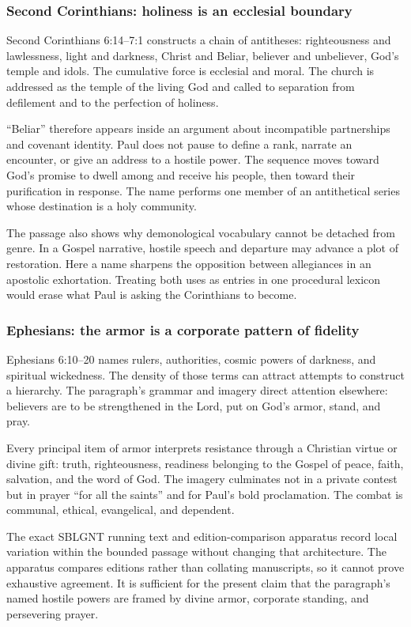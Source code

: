 \subsubsection{Second Corinthians: holiness is an ecclesial boundary}

Second Corinthians 6:14--7:1 constructs a chain of antitheses:
righteousness and lawlessness, light and darkness, Christ and Beliar, believer
and unbeliever, God's temple and idols. The cumulative force is ecclesial and
moral. The church is addressed as the temple of the living God and called to
separation from defilement and to the perfection of holiness.

``Beliar'' therefore appears inside an argument about incompatible
partnerships and covenant identity. Paul does not pause to define a rank,
narrate an encounter, or give an address to a hostile power. The sequence
moves toward God's promise to dwell among and receive his people, then toward
their purification in response. The name performs one member of an antithetical
series whose destination is a holy community.

The passage also shows why demonological vocabulary cannot be detached from
genre. In a Gospel narrative, hostile speech and departure may advance a plot
of restoration. Here a name sharpens the opposition between allegiances in
an apostolic exhortation. Treating both uses as entries in one procedural
lexicon would erase what Paul is asking the Corinthians to become.

\subsubsection{Ephesians: the armor is a corporate pattern of fidelity}

Ephesians 6:10--20 names rulers, authorities, cosmic powers of darkness, and
spiritual wickedness. The density of those terms can attract attempts to
construct a hierarchy. The paragraph's grammar and imagery direct attention
elsewhere: believers are to be strengthened in the Lord, put on God's armor,
stand, and pray.

Every principal item of armor interprets resistance through a Christian
virtue or divine gift: truth, righteousness, readiness belonging to the Gospel
of peace, faith, salvation, and the word of God. The imagery culminates not
in a private contest but in prayer ``for all the saints'' and for Paul's bold
proclamation. The combat is communal, ethical, evangelical, and dependent.

The exact SBLGNT running text and edition-comparison apparatus record local
variation within the bounded passage without changing that architecture.
The apparatus compares editions rather than collating manuscripts, so it
cannot prove exhaustive agreement. It is sufficient for the present
claim that the paragraph's named hostile powers are framed by divine armor,
corporate standing, and persevering prayer.

